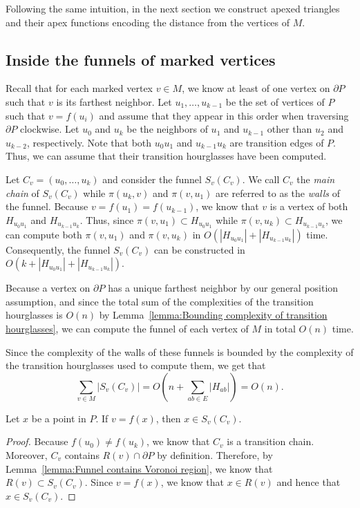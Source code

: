 \documentclass[a4paper,UKenglish]{lipics}
\newcommand{\fn}[2]{\ensuremath{S_{\scriptscriptstyle #1}(#2)}}
\newcommand{\ff}[1]{\ensuremath{f(#1)}}
\newcommand{\p}[2]{\ensuremath{\pi(#1, #2)}}
\begin{document}
Following the same intuition, in the next section we construct apexed triangles and their apex functions encoding the distance from the vertices of $M$.

\subsection{Inside the funnels of marked vertices}
Recall that for each marked vertex $v\in M$, we know at least of one vertex on $\partial P$ such that $v$ is its farthest neighbor.
Let $u_1, \ldots, u_{k-1}$ be the set of vertices of $P$ such that $v = \ff{u_i}$ and assume that they appear in this order when traversing $\partial P$ clockwise. Let $u_0$ and $u_k$ be the neighbors of $u_1$ and $u_{k-1}$ other than $u_2$ and $u_{k-2}$, respectively. Note that both $u_0 u_1$ and $u_{k-1}u_k$ are transition edges of $P$. Thus, we can assume that their transition hourglasses have been computed.

Let $C_v = (u_0, \ldots, u_k)$ and consider the funnel $\fn{v}{C_v}$.
We call $C_v$ the \emph{main chain} of $\fn{v}{C_v}$ while $\p{u_k}{ v}$ and $\p{v}{ u_1}$ are referred to as the \emph{walls} of the funnel.  
Because $v = \ff{u_1} = \ff{u_{k-1}}$, we know that $v$ is a vertex of both $H_{u_0 u_1}$ and  $H_{u_{k-1}u_k}$. 
Thus, since $\p{v}{ u_1}\subset H_{u_0u_1}$ while $\p{v}{u_k}\subset H_{u_{k-1}u_k}$, we can compute both $\p{v}{ u_1}$ and $\p{v}{u_k}$ in $O( |H_{u_0 u_1}| + |H_{u_{k-1}u_k}|)$ time.
Consequently, the funnel $\fn{v}{C_v}$ can be constructed in $O(k + |H_{u_0 u_1}| + |H_{u_{k-1}u_k}|)$. 

Because a vertex on $\partial P$ has a unique farthest neighbor by our general position assumption, and since the total sum of the complexities of the transition hourglasses is $O(n)$ by Lemma~\ref{lemma:Bounding complexity of transition hourglasses}, we can compute the funnel of each vertex of $M$ in total $O(n)$ time. 

Since the complexity of the walls of these funnels is bounded by the complexity of the transition hourglasses used to compute them, we get that $$\sum_{v\in M} |\fn{v}{C_v}|  = O\left(n + \sum_{ab\in E} |H_{ab}|\right) = O(n).$$

\begin{lemma}\label{lemma:Farthest points from marked are in funnel}
Let $x$ be a point in $P$. If $v = \ff{x}$, then $x\in \fn{v}{C_v}$.
\end{lemma}
\begin{proof}
Because $\ff{u_0} \neq \ff{u_k}$, we know that $C_v$ is a transition chain. Moreover, $C_v$ contains $R(v)\cap \partial P$ by definition. Therefore, by Lemma~\ref{lemma:Funnel contains Voronoi region}, we know that $R(v)\subset \fn{v}{C_v}$.
Since $v = \ff{x}$, we know that $x\in R(v)$ and hence that $x \in \fn{v}{C_v}$. 
\end{proof}
\end{document}
